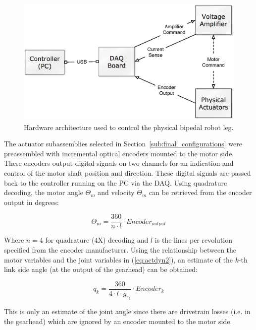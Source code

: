 \begin{figure}[!h]
	\centering
    \includegraphics[scale=0.65]{fig/experiments/hilarchitecture.eps} 
  	\caption{Hardware architecture used to control the physical bipedal robot leg.}
	\label{fig:hilarch}
\end{figure}

The actuator subassemblies selected in Section~\ref{sub:final_configurations} were preassembled with incremental optical encoders mounted to the motor side. These encoders output digital signals on two channels for an indication and control of the motor shaft position and direction.  These digital signals are passed back to the controller running on the PC via the DAQ. Using quadrature decoding, the motor angle $\Theta _m$ and velocity $\dot{\Theta}_m$ can be retrieved from the encoder output in degrees: 

\begin{equation}
	{\Theta _m} = \frac{{360}}{{n \cdot l}} \cdot Encoder_{output}
\end{equation}

Where $n = 4$ for quadrature (4X) decoding and $l$ is the lines per revolution specified from the encoder manufacturer. Using the relationship between the motor variables and the joint variables in (\ref{eq:actdyn2}), an estimate of the $k$-th link side angle (at the output of the gearhead) can be obtained: 

\begin{equation}
	{q_k} = \frac{{360}}{{4 \cdot l \cdot {g_{{r_k}}}}} \cdot Encode{r_k}
	\label{eq:quadrature}
\end{equation}

This is only an estimate of the joint angle since there are drivetrain losses (i.e. in the gearhead) which are ignored by an encoder mounted to the motor side. 

